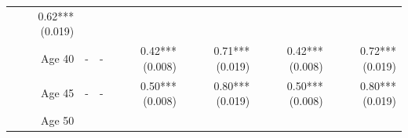 \documentclass[]{article}
\begin{document}
\begin{longtable}[c]{@{}rrrrrrr@{}}
\begin{minipage}[t]{0.11\columnwidth}
0.62*** (0.019)
\strut\end{minipage}\tabularnewline
\begin{minipage}[t]{0.12\columnwidth}\raggedleft\strut
Age 40
\strut\end{minipage} &
\begin{minipage}[t]{0.11\columnwidth}\raggedleft\strut
-
\strut\end{minipage} &
\begin{minipage}[t]{0.12\columnwidth}\raggedleft\strut
-
\strut\end{minipage} &
\begin{minipage}[t]{0.11\columnwidth}\raggedleft\strut
0.42*** (0.008)
\strut\end{minipage} &
\begin{minipage}[t]{0.12\columnwidth}\raggedleft\strut
0.71*** (0.019)
\strut\end{minipage} &
\begin{minipage}[t]{0.11\columnwidth}\raggedleft\strut
0.42*** (0.008)
\strut\end{minipage} &
\begin{minipage}[t]{0.11\columnwidth}\raggedleft\strut
0.72*** (0.019)
\strut\end{minipage}\tabularnewline
\begin{minipage}[t]{0.12\columnwidth}\raggedleft\strut
Age 45
\strut\end{minipage} &
\begin{minipage}[t]{0.11\columnwidth}\raggedleft\strut
-
\strut\end{minipage} &
\begin{minipage}[t]{0.12\columnwidth}\raggedleft\strut
-
\strut\end{minipage} &
\begin{minipage}[t]{0.11\columnwidth}\raggedleft\strut
0.50*** (0.008)
\strut\end{minipage} &
\begin{minipage}[t]{0.12\columnwidth}\raggedleft\strut
0.80*** (0.019)
\strut\end{minipage} &
\begin{minipage}[t]{0.11\columnwidth}\raggedleft\strut
0.50*** (0.008)
\strut\end{minipage} &
\begin{minipage}[t]{0.11\columnwidth}\raggedleft\strut
0.80*** (0.019)
\strut\end{minipage}\tabularnewline
\begin{minipage}[t]{0.12\columnwidth}\raggedleft\strut
Age 50
\strut\end{minipage} &

\end{longtable}
\end{document}
